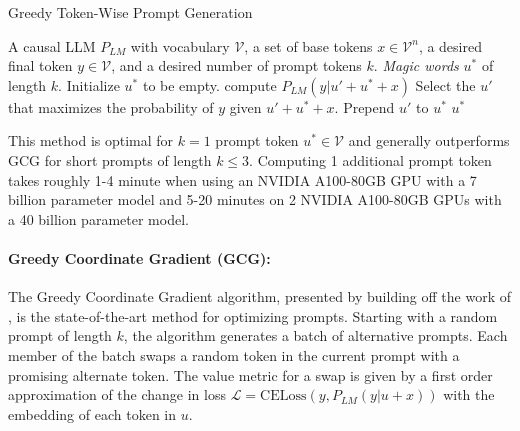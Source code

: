\documentclass{article} %
\begin{document}
\begin{algorithm}
\label{alg:greedy}
\caption{Greedy Token-Wise Prompt Generation}
\begin{algorithmic}[1]
\Require A causal LLM $P_{LM}$ with vocabulary $\mathcal V$, a set of base tokens $x \in \mathcal V^n$, a desired final token $y\in \mathcal V$, and a desired number of prompt tokens $k$.
\Ensure \textit{Magic words} $u^*$ of length $k$.
\State Initialize $u^*$ to be empty.
        \State compute $P_{LM} (y | u'+u^*+x)$
    \EndFor
    \State Select the $u'$ that maximizes the probability of $y$ given $u' + u^* + x$. Prepend $u'$ to $u^*$
\EndFor
\State \Return $u^*$
\end{algorithmic}
\end{algorithm}
This method is optimal for $k=1$ prompt token $u^{*}\in \mathcal V$ and generally outperforms GCG for short prompts of length $k\leq 3$. Computing 1 additional prompt token takes roughly 1-4 minute when using an NVIDIA A100-80GB GPU with a 7 billion parameter model and 5-20 minutes on 2 NVIDIA A100-80GB GPUs with a 40 billion parameter model. 




\paragraph{Greedy Coordinate Gradient (GCG): } The Greedy Coordinate Gradient algorithm, presented by \citep{zou2023universal} building off the work of \citep{shin2020autoprompt}, is the state-of-the-art method for optimizing prompts. Starting with a random prompt of length $k$, the algorithm generates a batch of alternative prompts. Each member of the batch swaps a random token in the current prompt with a promising alternate token. The value metric for a swap is given by a first order approximation of the change in loss $\mathcal L = \text{CELoss}(y, P_{LM}(y | u + x))$ with the embedding of each token in $u$. 
\end{document}
